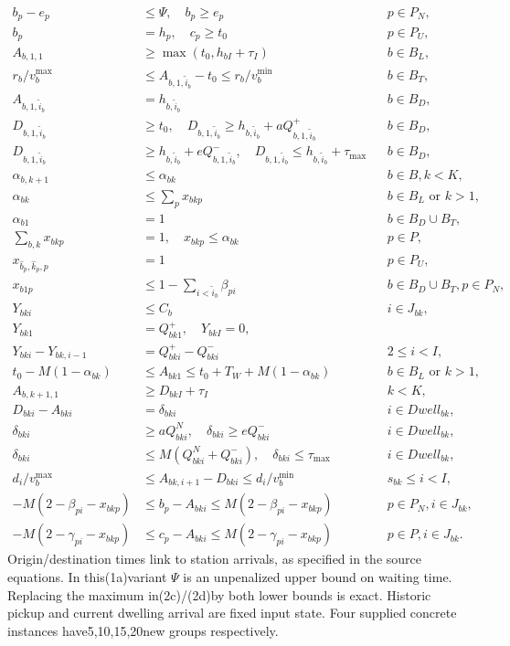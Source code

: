 \documentclass{article}
\begin{document}
\begin{align*}
b_p-e_p&\le\Psi,\quad b_p\ge e_p&&p\in P_N,\\
b_p&=h_p,\quad c_p\ge t_0&&p\in P_U,\\
A_{b,1,1}&\ge\max(t_0,h_{bI}+\tau_I)&&b\in B_L,\\
r_b/v_b^{\max}&\le A_{b,1,\tilde i_b}-t_0\le r_b/v_b^{\min}&&b\in B_T,\\
A_{b,1,\tilde i_b}&=h_{b,\tilde i_b}&&b\in B_D,\\
D_{b,1,\tilde i_b}&\ge t_0,\quad
D_{b,1,\tilde i_b}\ge h_{b,\tilde i_b}+aQ^+_{b,1,\tilde i_b}&&b\in B_D,\\
D_{b,1,\tilde i_b}&\ge h_{b,\tilde i_b}+eQ^-_{b,1,\tilde i_b},\quad
D_{b,1,\tilde i_b}\le h_{b,\tilde i_b}+\tau_{\max}&&b\in B_D,\\
\alpha_{b,k+1}&\le\alpha_{bk}&&b\in B,k<K,\\
\alpha_{bk}&\le\sum_p x_{bkp}&&b\in B_L\text{ or }k>1,\\
\alpha_{b1}&=1&&b\in B_D\cup B_T,\\
\sum_{b,k}x_{bkp}&=1,\quad x_{bkp}\le\alpha_{bk}&&p\in P,\\
x_{\hat b_p,\hat k_p,p}&=1&&p\in P_U,\\
x_{b1p}&\le1-\sum_{i<\tilde i_b}\beta_{pi}&&b\in B_D\cup B_T,p\in P_N,\\
Y_{bki}&\le C_b&&i\in J_{bk},\\
Y_{bk1}&=Q^+_{bk1},\quad Y_{bkI}=0,\\
Y_{bki}-Y_{bk,i-1}&=Q^+_{bki}-Q^-_{bki}&&2\le i<I,\\
t_0-M(1-\alpha_{bk})&\le A_{bk1}\le t_0+T_W+M(1-\alpha_{bk})
&&b\in B_L\text{ or }k>1,\\
A_{b,k+1,1}&\ge D_{bkI}+\tau_I&&k<K,\\
D_{bki}-A_{bki}&=\delta_{bki}&&i\in Dwell_{bk},\\
\delta_{bki}&\ge aQ^N_{bki},\quad\delta_{bki}\ge eQ^-_{bki}
&&i\in Dwell_{bk},\\
\delta_{bki}&\le M(Q^N_{bki}+Q^-_{bki}),\quad
\delta_{bki}\le\tau_{\max}&&i\in Dwell_{bk},\\
d_i/v_b^{\max}&\le A_{bk,i+1}-D_{bki}\le d_i/v_b^{\min}
&&s_{bk}\le i<I,\\
-M(2-\beta_{pi}-x_{bkp})&\le b_p-A_{bki}\le M(2-\beta_{pi}-x_{bkp})
&&p\in P_N,i\in J_{bk},\\
-M(2-\gamma_{pi}-x_{bkp})&\le c_p-A_{bki}\le M(2-\gamma_{pi}-x_{bkp})
&&p\in P,i\in J_{bk}.
\end{align*}
Origin/destination times link to station arrivals, as specified in the
source equations. In this(1a)variant
$\Psi$ is an unpenalized upper bound on waiting time.
Replacing the maximum in(2c)/(2d)by both lower bounds is exact.
Historic pickup and current dwelling arrival are fixed input state.
Four supplied concrete instances have5,10,15,20new groups respectively.
\end{document}
